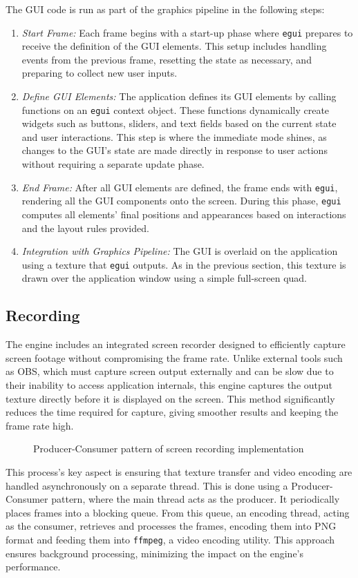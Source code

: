 The GUI code is run as part of the graphics pipeline in the following steps:
\begin{enumerate}
\item \emph{Start Frame:} Each frame begins with a start-up phase where \verb|egui| prepares to receive the definition of the GUI elements. This setup includes handling events from the previous frame, resetting the state as necessary, and preparing to collect new user inputs.

\item \emph{Define GUI Elements:} The application defines its GUI elements by calling functions on an \verb|egui| context object. These functions dynamically create widgets such as buttons, sliders, and text fields based on the current state and user interactions. This step is where the immediate mode shines, as changes to the GUI's state are made directly in response to user actions without requiring a separate update phase.

\item \emph{End Frame:} After all GUI elements are defined, the frame ends with \verb|egui|, rendering all the GUI components onto the screen. During this phase, \verb|egui| computes all elements' final positions and appearances based on interactions and the layout rules provided.

\item \emph{Integration with Graphics Pipeline:} The GUI is overlaid on the application using a texture that \verb|egui| outputs. As in the previous section, this texture is drawn over the application window using a simple full-screen quad.
\end{enumerate}

\subsection{Recording}

The engine includes an integrated screen recorder designed to efficiently capture screen footage without compromising the frame rate. Unlike external tools such as OBS, which must capture screen output externally and can be slow due to their inability to access application internals, this engine captures the output texture directly before it is displayed on the screen. This method significantly reduces the time required for capture, giving smoother results and keeping the frame rate high.

\begin{figure}[H]
  \centering
  
  \caption{Producer-Consumer pattern of screen recording implementation}
\end{figure}

This process's key aspect is ensuring that texture transfer and video encoding are handled asynchronously on a separate thread. This is done using a Producer-Consumer pattern, where the main thread acts as the producer. It periodically places frames into a blocking queue. From this queue, an encoding thread, acting as the consumer, retrieves and processes the frames, encoding them into PNG format and feeding them into \verb|ffmpeg|, a video encoding utility. This approach ensures background processing, minimizing the impact on the engine's performance.
